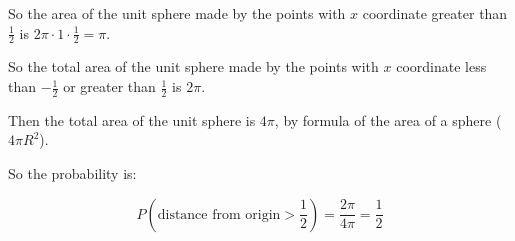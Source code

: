 So the area of the unit sphere made by the points with $x$ coordinate greater
than $\frac{1}{2}$ is $2\pi \cdot 1 \cdot \frac{1}{2} = \pi$.

So the total area of the unit sphere made by the points with $x$ coordinate
less than $-\frac{1}{2}$ or greater than $\frac{1}{2}$ is $2\pi$.

Then the total area of the unit sphere is $4\pi$, by formula of the area of a
sphere ($4\pi R^2$).

So the probability is:

\begin{equation*}
    P( \text{distance from origin} > \frac{1}{2} ) = \frac{2\pi}{4\pi} = \frac{1}{2}
\end{equation*}